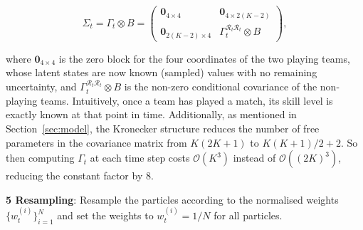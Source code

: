 \begin{equation}
    \Sigma_t = \Gamma_t \otimes B = 
    \begin{pmatrix}
        \mathbf{0}_{4 \times 4} & \mathbf{0}_{4 \times 2(K-2)} \\
        \mathbf{0}_{2(K-2) \times 4} & \Gamma_t^{\mathcal{R}_t\mathcal{R}_t} \otimes B
    \end{pmatrix},
    \nonumber
\end{equation}

where $\mathbf{0}_{4 \times 4}$ is the zero block for the four coordinates of the two playing teams, whose latent states are now known (sampled) values with no remaining uncertainty, and $\Gamma_t^{\mathcal{R}_t\mathcal{R}_t} \otimes B$ is the non-zero conditional covariance of the non-playing teams. Intuitively, once a team has played a match, its skill level is exactly known at that point in time. Additionally, as mentioned in Section~\ref{sec:model}, the Kronecker structure reduces the number of free parameters in the covariance matrix from $K(2K+1)$ to $K(K+1)/2 + 2$. So then computing $\Gamma_t$ at each time step costs $\mathcal{O}(K^3)$ instead of $\mathcal{O}((2K)^3)$, reducing the constant factor by 8.  



\textbf{5 Resampling}: Resample the particles according to the normalised weights $\{w_t^{(i)}\}_{i=1}^N$ and set the weights to $w_t^{(i)} = 1/N$ for all particles.

